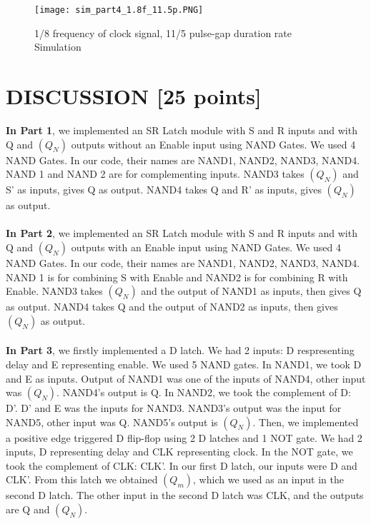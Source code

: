 \documentclass[pdftex,12pt,a4paper]{article}
\begin{document}
\begin{figure}[ht]
	\centering
	\texttt{[image: sim\_part4\_1.8f\_11.5p.PNG]}	
	\caption{1/8 frequency of clock signal, 11/5 pulse-gap duration rate Simulation}
	\label{fig22}
\end{figure}

\clearpage



\section{DISCUSSION [25 points]}
\textbf{In Part 1}, we implemented an SR Latch module with S and R inputs and with Q and \((Q_N)\) outputs without an Enable input using NAND Gates. We used 4 NAND Gates.  In our code, their names are NAND1, NAND2, NAND3, NAND4. NAND 1 and NAND 2  are for complementing inputs. NAND3 takes \((Q_N)\)  and S' as inputs, gives Q as output. NAND4 takes Q  and R' as inputs, gives \((Q_N)\) as output.
\\
\\
\textbf{In Part 2}, we implemented an SR Latch module with S and R inputs and with Q and \((Q_N)\) outputs with an Enable input using NAND Gates. We used 4 NAND Gates.  In our code, their names are NAND1, NAND2, NAND3, NAND4. NAND 1 is for combining S with Enable and NAND2 is for combining R with Enable. NAND3 takes \((Q_N)\)  and the output of NAND1 as inputs, then gives Q as output. NAND4 takes Q  and the output of NAND2 as inputs, then gives \((Q_N)\) as output.
\\
\\
\textbf{In Part 3}, we firstly implemented a D latch. We had 2 inputs: D respresenting delay and E representing enable. We used 5 NAND gates. In NAND1, we took D and E as inputs. Output of NAND1 was one of the inputs of NAND4, other input was \((Q_N)\). NAND4’s output is Q. In NAND2, we took the complement of D: D’. D’ and E was the inputs for NAND3. NAND3’s output was the input for NAND5, other input was Q. NAND5’s output is \((Q_N)\).
Then, we implemented a positive edge triggered D flip-flop using 2 D latches and 1 NOT gate. We had 2 inputs, D representing delay and CLK representing clock. In the NOT gate, we took the complement of CLK: CLK’. In our first D latch, our inputs were D and CLK’. From this latch we obtained \((Q_m)\), which we used as an input in the second D latch. The other input in the second D latch was CLK, and the outputs are Q and \((Q_N)\).
\\
\\
\end{document}
